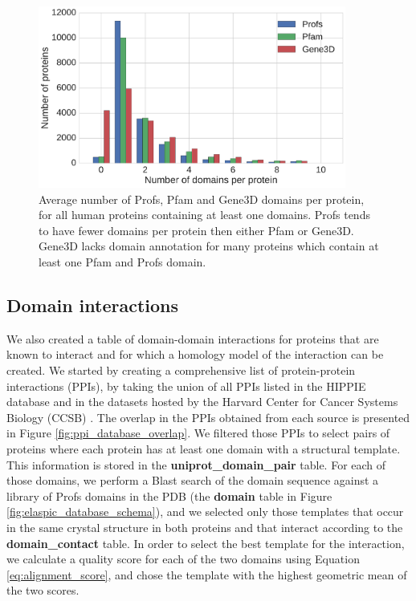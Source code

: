 \begin{figure}[!tb]
	\centering
	\includegraphics[width=0.9\textwidth]{static/profs/domains_per_protein.pdf}
	\caption[Profs, Pfam, and Gene3D domains per protein.]{Average number of Profs, Pfam and Gene3D domains per protein, for all human proteins containing at least one domains. Profs tends to have fewer domains per protein then either Pfam or Gene3D. Gene3D lacks domain annotation for many proteins which contain at least one Pfam and Profs domain.}
	\label{fig:profs_domain_size}
\end{figure}


\subsection{Domain interactions}

We also created a table of domain-domain interactions for proteins that are known to interact and for which a homology model of the interaction can be created. We started by creating a comprehensive list of protein-protein interactions (PPIs), by taking the union of all PPIs listed in the HIPPIE database \cite{schaefer_hippie:_2012} and in the datasets hosted by the Harvard Center for Cancer Systems Biology (CCSB) \cite{rolland_proteome-scale_2014}. The overlap in the PPIs obtained from each source is presented in Figure \ref{fig:ppi_database_overlap}. We filtered those PPIs to select pairs of proteins where each protein has at least one domain with a structural template. This information is stored in the \textbf{uniprot\_domain\_pair} table. For each of those domains, we perform a Blast search of the domain sequence against a library of Profs domains in the PDB (the \textbf{domain} table in Figure \ref{fig:elaspic_database_schema}), and we selected only those templates that occur in the same crystal structure in both proteins and that interact according to the \textbf{domain\_contact} table. In order to select the best template for the interaction, we calculate a quality score for each of the two domains using Equation \ref{eq:alignment_score}, and chose the template with the highest geometric mean of the two scores.


